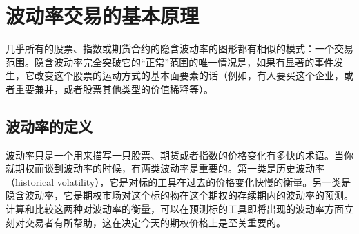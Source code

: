 \chapter{波动率交易的基本原理}
几乎所有的股票、指数或期货合约的隐含波动率的图形都有相似的模式：一个交易范围。隐含波动率完全突破它的“正常”范围的唯一情况是，如果有显著的事件发生，它改变这个股票的运动方式的基本面要素的话（例如，有人要买这个企业，或者重要兼并，或者股票其他类型的价值稀释等）。
\section{波动率的定义}
波动率只是一个用来描写一只股票、期货或者指数的价格变化有多快的术语。当你就期权而谈到波动率的时候，有两类波动率是重要的。第一类是历史波动率（historical volatility），它是对标的工具在过去的价格变化快慢的衡量。另一类是隐含波动率，它是期权市场对这个标的物在这个期权的存续期内的波动率的预测。计算和比较这两种对波动率的衡量，可以在预测标的工具即将出现的波动率方面立刻对交易者有所帮助，这在决定今天的期权价格上是至关重要的。